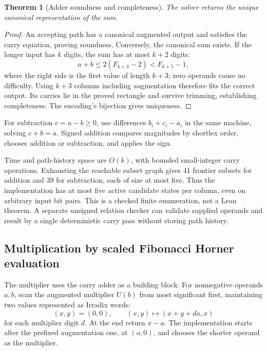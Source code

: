 \documentclass[11pt]{article}
\newtheorem{theorem}{Theorem}[section]
\theoremstyle{definition}\newtheorem{definition}[theorem]{Definition}
\begin{document}
\begin{theorem}[Adder soundness and completeness]
The solver returns the unique canonical representation of the sum.
\end{theorem}
\begin{proof}
An accepting path has a canonical augmented output and satisfies the
carry equation, proving soundness. Conversely, the canonical sum exists.
If the longer input has $k$ digits, the sum has at most $k+2$ digits:
\[
a+b\le2(F_{k+3}-2)<F_{k+5}-1,
\]
where the right side is the first value of length $k+3$; zero operands
cause no difficulty. Using $k+3$ columns including augmentation therefore
fits the correct output. Its carries lie in the proved rectangle and
survive trimming, establishing completeness. The encoding's bijection
gives uniqueness.
\end{proof}
For subtraction $c=a-b\ge0$, use differences $b_i+c_i-a_i$ in the same
machine, solving $c+b=a$. Signed addition compares magnitudes by shortlex
order, chooses addition or subtraction, and applies the sign.

Time and path-history space are $O(k)$, with bounded small-integer carry
operations. Exhausting the reachable subset graph gives 41 frontier
subsets for addition and 39 for subtraction, each of size at most five.
Thus the implementation has at most five active candidate states per
column, even on arbitrary input bit pairs. This is a checked finite
enumeration, not a Lean theorem. A separate unsigned relation checker
can validate supplied operands and result by a single deterministic
carry pass without storing path history.

\subsection{Multiplication by scaled Fibonacci Horner evaluation}
The multiplier uses the carry adder as a building block. For nonnegative
operands $a,b$, scan the augmented multiplier $U(b)$ from most significant
first, maintaining two values represented as Irradix words:
\[
(x,y)=(0,0),\qquad
(x,y)\longmapsto(x+y+da,x)
\]
for each multiplier digit $d$. At the end return $x-a$.
The implementation starts after the prefixed augmentation one, at
$(a,0)$, and chooses the shorter operand as the multiplier.
\end{document}
